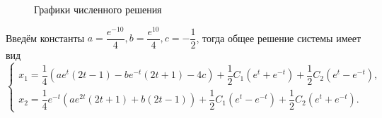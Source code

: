 \documentclass[a4paper, 12pt]{article}
\begin{document}
\begin{figure}[h]
    \noindent{}
    \caption{Графики численного решения}
    \label{21end}
\end{figure} 

Введём константы $a=\dfrac{e^{-10}}{4},b=\dfrac{e^{10}}{4},c=-\dfrac{1}{2}$, тогда общее решение системы имеет вид
\begin{equation}
    \begin{cases}
        x_1 =\dfrac{1}{4}\left(a e^t (2t-1) - b e^{-t} (2t+1)-4c  \right) +\dfrac{1}{2} C_1 (e^t + e^{-t}) + \dfrac{1}{2} C_2 (e^t - e^{-t}),\\
        x_2=\dfrac{1}{4} e^{-t} \left(a e^{2t} (2t+1) +b (2t-1) \right) +\dfrac{1}{2} C_1 (e^t-e^{-t})+\dfrac{1}{2} C_2 (e^t + e^{-t}).
    \end{cases}
\end{equation}
\end{document}
